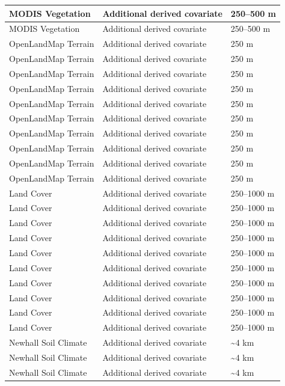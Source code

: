 \documentclass[
  10pt,
  b5paper,
  oneside]{book}
\begin{document}
\begin{table}
\begin{tabular}[t]{l|l|l}
MODIS Vegetation & Additional derived covariate & 250–500 m\\
\hline
MODIS Vegetation & Additional derived covariate & 250–500 m\\
\hline
OpenLandMap Terrain & Additional derived covariate & 250 m\\
\hline
OpenLandMap Terrain & Additional derived covariate & 250 m\\
\hline
OpenLandMap Terrain & Additional derived covariate & 250 m\\
\hline
OpenLandMap Terrain & Additional derived covariate & 250 m\\
\hline
OpenLandMap Terrain & Additional derived covariate & 250 m\\
\hline
OpenLandMap Terrain & Additional derived covariate & 250 m\\
\hline
OpenLandMap Terrain & Additional derived covariate & 250 m\\
\hline
OpenLandMap Terrain & Additional derived covariate & 250 m\\
\hline
OpenLandMap Terrain & Additional derived covariate & 250 m\\
\hline
OpenLandMap Terrain & Additional derived covariate & 250 m\\
\hline
Land Cover & Additional derived covariate & 250–1000 m\\
\hline
Land Cover & Additional derived covariate & 250–1000 m\\
\hline
Land Cover & Additional derived covariate & 250–1000 m\\
\hline
Land Cover & Additional derived covariate & 250–1000 m\\
\hline
Land Cover & Additional derived covariate & 250–1000 m\\
\hline
Land Cover & Additional derived covariate & 250–1000 m\\
\hline
Land Cover & Additional derived covariate & 250–1000 m\\
\hline
Land Cover & Additional derived covariate & 250–1000 m\\
\hline
Land Cover & Additional derived covariate & 250–1000 m\\
\hline
Land Cover & Additional derived covariate & 250–1000 m\\
\hline
Newhall Soil Climate & Additional derived covariate & \textasciitilde{}4 km\\
\hline
Newhall Soil Climate & Additional derived covariate & \textasciitilde{}4 km\\
\hline
Newhall Soil Climate & Additional derived covariate & \textasciitilde{}4 km\\

\end{tabular}
\end{table}
\end{document}
